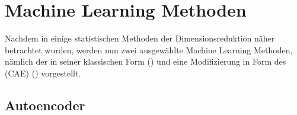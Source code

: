 \newpage
\section{Machine Learning Methoden}
\label{ch:MethodenDerDimRed:modern}
Nachdem in  einige statistischen Methoden der
Dimensionsreduktion näher betrachtet wurden, werden nun zwei ausgewählte Machine Learning Methoden,
nämlich der  in seiner klassischen Form
() und eine Modifizierung in Form des  (CAE) () vorgestellt.

\subsection{Autoencoder}
\label{ch:MethodenDerDimRed:ML:AE}


